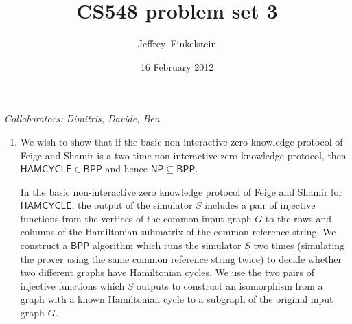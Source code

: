 \documentclass[draft]{article}
\author{Jef{}frey~Finkelstein}
\date{16 February 2012}
\title{CS548 problem set 3}
\newcommand{\collaborators}[1]{\emph{Collaborators: #1}}
\newcommand{\class}[1]{{\ensuremath{\mathsf{#1}}}}
\newcommand{\lang}[1]{{\ensuremath{\mathsf{#1}}}}
\newcommand{\BPP}{\class{BPP}}
\newcommand{\NP}{\class{NP}}
\begin{document}
\maketitle
\collaborators{Dimitris, Davide, Ben}
\begin{enumerate}
\item
  We wish to show that if the basic non-interactive zero knowledge protocol of Feige and Shamir is a two-time non-interactive zero knowledge protocol, then $\lang{HAMCYCLE}\in\BPP$ and hence $\NP\subseteq\BPP$.

  In the basic non-interactive zero knowledge protocol of Feige and Shamir for \lang{HAMCYCLE}, the output of the simulator $S$ includes a pair of injective functions from the vertices of the common input graph $G$ to the rows and columns of the Hamiltonian submatrix of the common reference string.
  We construct a $\BPP$ algorithm which runs the simulator $S$ two times (simulating the prover using the same common reference string twice) to decide whether two different graphs have Hamiltonian cycles.
  We use the two pairs of injective functions which $S$ outputs to construct an isomorphism from a graph with a known Hamiltonian cycle to a subgraph of the original input graph $G$.


\end{enumerate}
\end{document}
